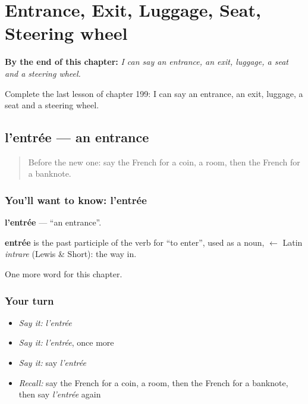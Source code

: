 
\chapter{Entrance, Exit, Luggage, Seat, Steering wheel}
\label{ch:fr-entrance-exit-luggage-seat-steering-wheel}

\begin{chapteropening}
\textbf{By the end of this chapter:} \emph{I can say an entrance, an exit, luggage, a seat and a steering wheel.}

Complete the last lesson of chapter 199: I can say an entrance, an exit, luggage, a seat and a steering wheel.
\end{chapteropening}

\section[l'entrée]{l'entrée — an entrance}

\label{lesson:FR-C199-entree}



\begin{quote}
Before the new one: say the French for a coin, a room, then the French for a banknote.
\end{quote}

\subsection*{You'll want to know: l'entrée}
\textbf{l'entrée} — \textquotedblleft{}an entrance\textquotedblright{}.

\begin{cousinweb}
\textbf{entrée} is the past participle of the verb for \textquotedblleft{}to enter\textquotedblright{}, used as a noun, $\leftarrow$ Latin \emph{intrare} (Lewis \& Short): the way in.
\end{cousinweb}

\begin{grammarlens}[title={What you've built}]
One more word for this chapter.
\end{grammarlens}

\subsection*{Your turn}
\begin{itemize}
\raggedright
  \item \emph{Say it:} \emph{l'entrée}
  \item \emph{Say it:} \emph{l'entrée}, once more
  \item \emph{Say it:} say \emph{l'entrée}
  \item \emph{Recall:} say the French for a coin, a room, then the French for a banknote, then say \emph{l'entrée} again
\end{itemize}

